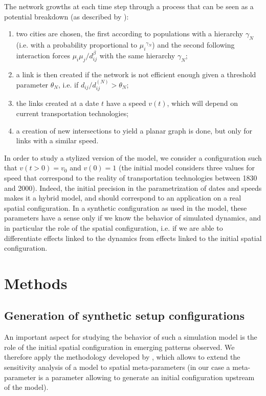 \documentclass[graybox]{svmult}
\begin{document}
The network growths at each time step through a process that can be seen as a potential breakdown (as described by \cite{raimbault:tel-01857741}):
\begin{enumerate}
	\item two cities are chosen, the first according to populations with a hierarchy $\gamma_N$ (i.e. with a probability proportional to ${\mu_i}^{\gamma_N}$) and the second following interaction forces $\mu_i \mu_j / d_{ij}^\beta$ with the same hierarchy $\gamma_N$;
	\item a link is then created if the network is not efficient enough given a threshold parameter $\theta_N$, i.e. if $d_{ij}/d^{(N)}_{ij}> \theta_N$;
	\item the links created at a date $t$ have a speed $v(t)$, which will depend on current transportation technologies;
	\item a creation of new intersections to yield a planar graph is done, but only for links with a similar speed.
\end{enumerate}

In order to study a stylized version of the model, we consider a configuration such that $v(t > 0) = v_0$ and $v(0) = 1$ (the initial model considers three values for speed that correspond to the reality of transportation technologies between 1830 and 2000). Indeed, the initial precision in the parametrization of dates and speeds makes it a hybrid model, and should correspond to an application on a real spatial configuration. In a synthetic configuration as used in the model, these parameters have a sense only if we know the behavior of simulated dynamics, and in particular the role of the spatial configuration, i.e. if we are able to differentiate effects linked to the dynamics from effects linked to the initial spatial configuration.



\section{Methods}

\subsection{Generation of synthetic setup configurations}


An important aspect for studying the behavior of such a simulation model is the role of the initial spatial configuration in emerging patterns observed. We therefore apply the methodology developed by \cite{cottineau2017initial}, which allows to extend the sensitivity analysis of a model to spatial meta-parameters (in our case a meta-parameter is a parameter allowing to generate an initial configuration upstream of the model).
\end{document}
